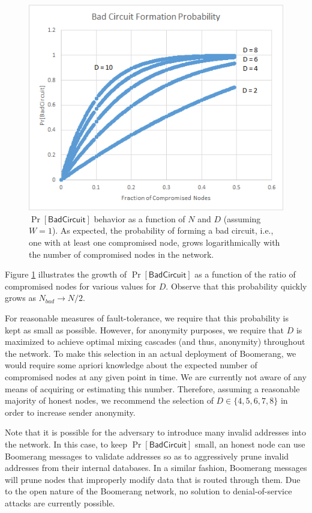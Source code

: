 \begin{figure}[ht!]
\begin{center}
\includegraphics[scale=0.65]{./images/badcircuit.png}
\caption{$\Pr[\mathsf{BadCircuit}]$ behavior as a function of $N$ and $D$ (assuming $W = 1$). As expected, the probability of forming a bad circuit, i.e., one with at least one compromised node, grows logarithmically with the number of compromised nodes in the network.}
\label{fig:badcircuit}
\end{center}
\end{figure}

Figure \ref{fig:badcircuit} illustrates the growth of $\Pr[\mathsf{BadCircuit}]$ as a function of the ratio of compromised nodes for various values for $D$. Observe that this probability quickly grows as $N_{bad} \to N/2$.

For reasonable measures of fault-tolerance, we require that this probability is kept as small as possible. However, for anonymity purposes, we require that $D$ is maximized to achieve optimal mixing cascades (and thus, anonymity) throughout the network. To make this selection in an actual deployment of Boomerang, we would require some apriori knowledge about the expected number of compromised nodes at any given point in time. We are currently not aware of any means of acquiring or estimating this number. Therefore, assuming a reasonable majority of honest nodes, we recommend the selection of $D \in \{4, 5, 6, 7, 8\}$ in order to increase sender anonymity. 

Note that it is possible for the adversary to introduce many invalid addresses into the network. In this case, to keep $\Pr[\mathsf{BadCircuit}]$ small, an honest node can use Boomerang messages to validate addresses so as to aggressively prune invalid addresses from their internal databases. In a similar fashion, Boomerang messages will prune nodes that improperly modify data that is routed through them. Due to the open nature of the Boomerang network, no solution to denial-of-service attacks are currently possible.

